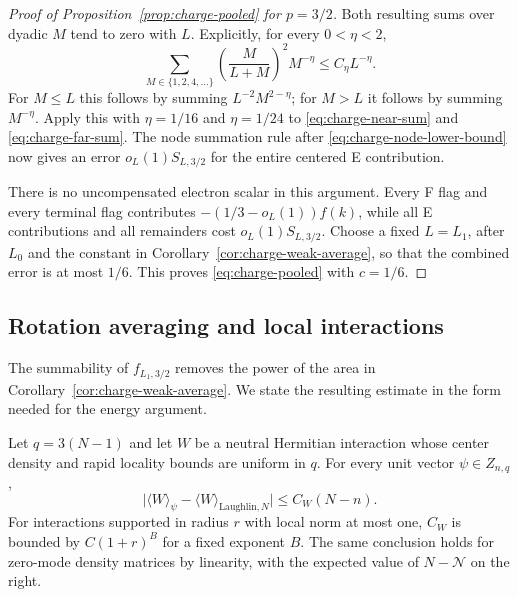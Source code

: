 \begin{proof}[Proof of Proposition~\ref{prop:charge-pooled} for $p=3/2$]
Both resulting sums over dyadic $M$ tend to zero with $L$.
Explicitly, for every $0<\eta<2$,
\begin{equation}\label{eq:charge-dyadic-sum}
 \sum_{M\in\{1,2,4,\ldots\}}
 \left(\frac M{L+M}\right)^2M^{-\eta}
 \le C_\eta L^{-\eta}.
\end{equation}
For $M\le L$ this follows by summing $L^{-2}M^{2-\eta}$;
for $M>L$ it follows by summing $M^{-\eta}$.
Apply this with $\eta=1/16$ and $\eta=1/24$ to
\eqref{eq:charge-near-sum} and \eqref{eq:charge-far-sum}.
The node summation rule after
\eqref{eq:charge-node-lower-bound} now gives an error
$o_L(1)S_{L,3/2}$ for the entire centered E contribution.

There is no uncompensated electron scalar in this argument.
Every F flag and every terminal flag contributes
$-(1/3-o_L(1))f(k)$, while all E contributions and all remainders
cost $o_L(1)S_{L,3/2}$.  Choose a fixed $L=L_1$, after $L_0$ and
the constant in Corollary~\ref{cor:charge-weak-average}, so that
the combined error is at most $1/6$.  This proves
\eqref{eq:charge-pooled} with $c=1/6$.
\end{proof}

\subsection{Rotation averaging and local interactions}

The summability of $f_{L_1,3/2}$ removes the power of the area in
Corollary~\ref{cor:charge-weak-average}.  We state the resulting
estimate in the form needed for the energy argument.

\begin{theorem}
\label{thm:charge-local-linear}
Let $q=3(N-1)$ and let $W$ be a neutral Hermitian interaction whose
center density and rapid locality bounds are uniform in $q$.
For every unit vector $\psi\in Z_{n,q}$,
\begin{equation}\label{eq:charge-local-linear}
 \bigl|\langle W\rangle_\psi-
          \langle W\rangle_{\mathrm{Laughlin},N}\bigr|
 \le C_W(N-n).
\end{equation}
For interactions supported in radius $r$ with local norm at most
one, $C_W$ is bounded by $C(1+r)^B$ for a fixed exponent $B$.
The same conclusion holds for zero-mode density matrices by
linearity, with the expected value of $N-\mathcal N$ on the right.
\end{theorem}

